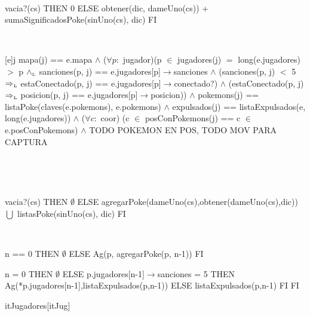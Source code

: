 \begin{Representacion}
	~

	{\IF vacia?(cs) THEN
		0
	ELSE
		obtener(dic, dameUno(cs)) + sumaSignificadosPoke(sinUno(cs), dic)
	FI}
		
	~
	

	{j}{
		mapa(j) == e.mapa $\land$ ($\forall p:$ jugador)(p $\in$ jugadores(j) $=$ long(e.jugadores) $>$ p $\land_{\mathrm{\scriptscriptstyle{L}}}$ sanciones(p, j) == e.jugadores[p]$\rightarrow$sanciones $\land$ (sanciones(p, j) $<$ 5 $\Rightarrow_{\mathrm{\scriptscriptstyle{L}}}$ estaConectado(p, j) == e.jugadores[p]$\rightarrow$conectado?) $\land$ (estaConectado(p, j) $\Rightarrow_{\mathrm{\scriptscriptstyle{L}}}$ posicion(p, j) == e.jugadores[p]$\rightarrow$posicion)) $\land$ pokemons(j) == listaPoke(claves(e.pokemons), e.pokemons) $\land$ expulsados(j) == listaExpulsados(e, long(e.jugadores)) $\land$ ($\forall c:$ coor) (c $\in$ posConPokemons(j) == c $\in$ e.posConPokemons) $\land$ TODO POKEMON EN POS, TODO MOV PARA CAPTURA
	}
	
	~

		 
	~

	{\IF vacia?(cs) THEN
		$\emptyset$
	ELSE
		agregarPoke(dameUno(cs),obtener(dameUno(cs),dic)) $\bigcup$ listasPoke(sinUno(cs), dic)
	FI}
		
	~

	{\IF n == 0 THEN
		$\emptyset$
	ELSE
		Ag(p, agregarPoke(p, n-1))
	FI}
	
	{\IF n = 0 THEN
		$\emptyset$
	ELSE
		{\IF p.jugadores[n-1]$\rightarrow$sanciones = 5 THEN
			Ag(*p.jugadores[n-1],listaExpulsados(p,n-1))
		ELSE
			listaExpulsados(p,n-1)
		FI}
	FI}
	
	



	\begin{Estructura}{itJugadores}[itJug]
		\begin{Tupla}[itJug]
		\end{Tupla}
	\end{Estructura}


\end{Representacion}
